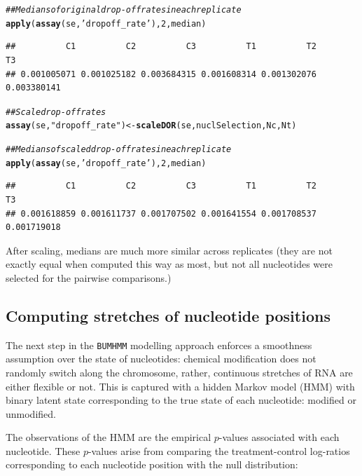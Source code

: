 \documentclass{article}\usepackage[]{graphicx}\usepackage[usenames,dvipsnames]{color}
\makeatletter
\newcommand{\hlnum}[1]{\textcolor[rgb]{0.686,0.059,0.569}{#1}}%
\newcommand{\hlstr}[1]{\textcolor[rgb]{0.192,0.494,0.8}{#1}}%
\newcommand{\hlcom}[1]{\textcolor[rgb]{0.678,0.584,0.686}{\textit{#1}}}%
\newcommand{\hlstd}[1]{\textcolor[rgb]{0.345,0.345,0.345}{#1}}%
\newcommand{\hlkwb}[1]{\textcolor[rgb]{0.69,0.353,0.396}{#1}}%
\newcommand{\hlkwd}[1]{\textcolor[rgb]{0.737,0.353,0.396}{\textbf{#1}}}%
\newenvironment{kframe}{%
 \def\at@end@of@kframe{}%
 \ifinner\ifhmode%
  \def\at@end@of@kframe{\end{minipage}}%
  \begin{minipage}{\columnwidth}%
 \fi\fi%
 \def\FrameCommand##1{\hskip\@totalleftmargin \hskip-\fboxsep
 \colorbox{shadecolor}{##1}\hskip-\fboxsep
     \hskip-\linewidth \hskip-\@totalleftmargin \hskip\columnwidth}%
 \MakeFramed {\advance\hsize-\width
   \@totalleftmargin\z@ \linewidth\hsize
   \@setminipage}}%
 {\par\unskip\endMakeFramed%
 \at@end@of@kframe}
\newenvironment{knitrout}{}{} %
\makeatother
\begin{document}
\begin{knitrout}
\color{fgcolor}\begin{kframe}
\begin{alltt}
\hlcom{## Medians of original drop-off rates in each replicate}
\hlkwd{apply}\hlstd{(}\hlkwd{assay}\hlstd{(se,} \hlstr{'dropoff_rate'}\hlstd{),} \hlnum{2}\hlstd{, median)}
\end{alltt}
\begin{verbatim}
##          C1          C2          C3          T1          T2          T3 
## 0.001005071 0.001025182 0.003684315 0.001608314 0.001302076 0.003380141
\end{verbatim}
\begin{alltt}
\hlcom{## Scale drop-off rates}
\hlkwd{assay}\hlstd{(se,} \hlstr{"dropoff_rate"}\hlstd{)} \hlkwb{<-} \hlkwd{scaleDOR}\hlstd{(se, nuclSelection, Nc, Nt)}

\hlcom{## Medians of scaled drop-off rates in each replicate}
\hlkwd{apply}\hlstd{(}\hlkwd{assay}\hlstd{(se,} \hlstr{'dropoff_rate'}\hlstd{),} \hlnum{2}\hlstd{, median)}
\end{alltt}
\begin{verbatim}
##          C1          C2          C3          T1          T2          T3 
## 0.001618859 0.001611737 0.001707502 0.001641554 0.001708537 0.001719018
\end{verbatim}
\end{kframe}
\end{knitrout}

After scaling, medians are much more similar across replicates (they are not
exactly equal when computed this way as most, but not all nucleotides were
selected for the pairwise comparisons.)

\subsection{Computing stretches of nucleotide positions}

The next step in the \verb|BUMHMM| modelling approach enforces a smoothness
assumption over the state of nucleotides: chemical modification does not
randomly switch along the chromosome, rather, continuous stretches of RNA are
either flexible or not. This is captured with a hidden Markov model (HMM) with
binary latent state corresponding to the true state of each nucleotide: modified
or unmodified.

The observations of the HMM are the empirical $p$-values associated with each
nucleotide. These $p$-values arise from comparing the treatment-control
log-ratios corresponding to each nucleotide position with the null distribution:
\end{document}
